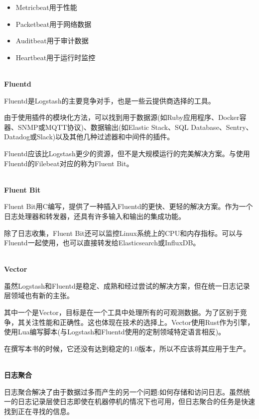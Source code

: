 \begin{itemize}
\item 
Metricbeat用于性能

\item 
Packetbeat用于网络数据

\item 
Auditbeat用于审计数据

\item 
Heartbeat用于运行时监控
\end{itemize}

\hspace*{\fill} \\ %
\noindent
\textbf{Fluentd}

Fluentd是Logstash的主要竞争对手，也是一些云提供商选择的工具。

由于使用插件的模块化方法，可以找到用于数据源(如Ruby应用程序、Docker容器、SNMP或MQTT协议)、数据输出(如Elastic Stack、SQL Database、Sentry、Datadog或Slack)以及其他几种过滤器和中间件的插件。

Fluentd应该比Logstash更少的资源，但不是大规模运行的完美解决方案。与使用Fluentd的Filebeat对应的称为Fluent Bit。

\hspace*{\fill} \\ %
\noindent
\textbf{Fluent Bit}

Fluent Bit用C编写，提供了一种插入Fluentd的更快、更轻的解决方案。作为一个日志处理器和转发器，还具有许多输入和输出的集成功能。

除了日志收集，Fluent Bit还可以监控Linux系统上的CPU和内存指标。可以与Fluentd一起使用，也可以直接转发给Elasticsearch或InfluxDB。

\hspace*{\fill} \\ %
\noindent
\textbf{Vector}

虽然Logstash和Fluentd是稳定、成熟和经过尝试的解决方案，但在统一日志记录层领域也有新的主张。

其中一个是Vector，目标是在一个工具中处理所有的可观测数据。为了区别于竞争，其关注性能和正确性。这也体现在技术的选择上。Vector使用Rust作为引擎，使用Lua编写脚本(与Logstash和Fluentd使用的定制领域特定语言相反)。

在撰写本书的时候，它还没有达到稳定的1.0版本，所以不应该将其应用于生产。

\hspace*{\fill} \\ %
\noindent
\textbf{日志聚合}

日志聚合解决了由于数据过多而产生的另一个问题:如何存储和访问日志。虽然统一的日志记录层使日志即使在机器停机的情况下也可用，但日志聚合的任务是快速找到正在寻找的信息。

